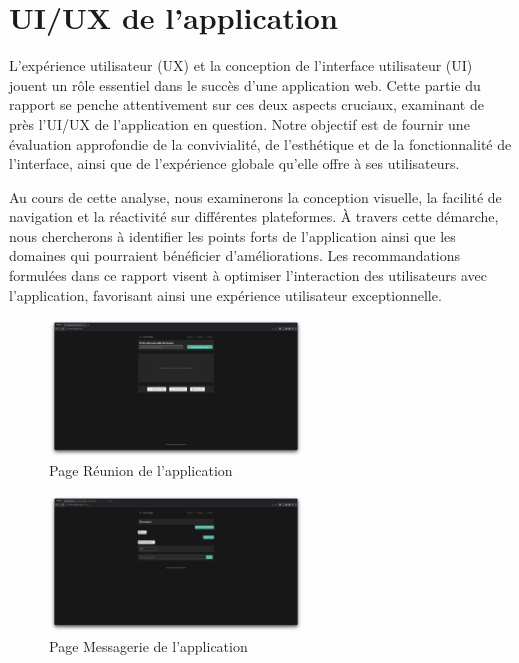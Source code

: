 \documentclass[12pt, a4paper, oneside]{Thesis}
\begin{document}
\newpage

\newpage

\section{UI/UX de l'application}
L'expérience utilisateur (UX) et la conception de l'interface utilisateur (UI) jouent un rôle essentiel dans le succès d'une application web. Cette partie du rapport se penche attentivement sur ces deux aspects cruciaux, examinant de près l'UI/UX de l'application en question. Notre objectif est de fournir une évaluation approfondie de la convivialité, de l'esthétique et de la fonctionnalité de l'interface, ainsi que de l'expérience globale qu'elle offre à ses utilisateurs.

Au cours de cette analyse, nous examinerons la conception visuelle, la facilité de navigation et la réactivité sur différentes plateformes. À travers cette démarche, nous chercherons à identifier les points forts de l'application ainsi que les domaines qui pourraient bénéficier d'améliorations. Les recommandations formulées dans ce rapport visent à optimiser l'interaction des utilisateurs avec l'application, favorisant ainsi une expérience utilisateur exceptionnelle.

\begin{figure}[h]
    \centering
    \includegraphics[width=0.6\textwidth]{images/PageReunionApplication.png}
    \caption{Page Réunion de l'application}
\end{figure}

\begin{figure}[h]
    \centering
    \includegraphics[width=0.6\textwidth]{images/PageMessagerieApplication.png}
    \caption{Page Messagerie de l'application}
\end{figure}
\end{document}
